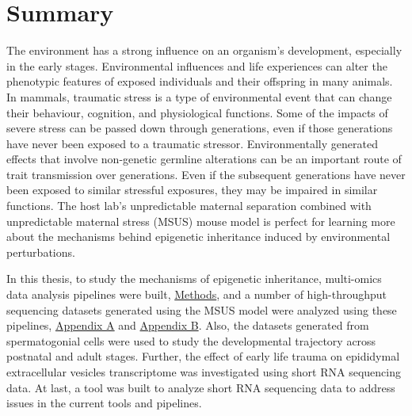 \documentclass[12pt,twoside]{reedthesis}
\begin{document}
\hypertarget{summary}{%
\chapter*{Summary}\label{summary}}

The environment has a strong influence on an organism's development, especially in the early stages. Environmental influences and life experiences can alter the phenotypic features of exposed individuals and their offspring in many animals. In mammals, traumatic stress is a type of environmental event that can change their behaviour, cognition, and physiological functions. Some of the impacts of severe stress can be passed down through generations, even if those generations have never been exposed to a traumatic stressor. Environmentally generated effects that involve non-genetic germline alterations can be an important route of trait transmission over generations. Even if the subsequent generations have never been exposed to similar stressful exposures, they may be impaired in similar functions. The host lab's unpredictable maternal separation combined with unpredictable maternal stress (MSUS) mouse model is perfect for learning more about the mechanisms behind epigenetic inheritance induced by environmental perturbations.

In this thesis, to study the mechanisms of epigenetic inheritance, multi-omics data analysis pipelines were built, \protect\hyperlink{methods}{Methods}, and a number of high-throughput sequencing datasets generated using the MSUS model were analyzed using these pipelines, \protect\hyperlink{aa}{Appendix A} and \protect\hyperlink{ab}{Appendix B}. Also, the datasets generated from spermatogonial cells were used to study the developmental trajectory across postnatal and adult stages. Further, the effect of early life trauma on epididymal extracellular vesicles transcriptome was investigated using short RNA sequencing data. At last, a tool was built to analyze short RNA sequencing data to address issues in the current tools and pipelines.
\end{document}
